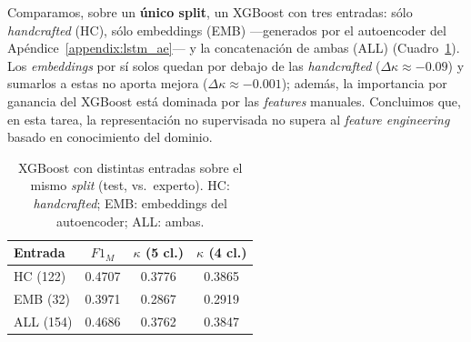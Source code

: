 \documentclass[conference]{IEEEtran}
\begin{document}
Comparamos, sobre un \textbf{único split}, un XGBoost con tres entradas: sólo \emph{handcrafted} (HC), sólo embeddings (EMB) ---generados por el autoencoder del Apéndice~\ref{appendix:lstm_ae}--- y la concatenación de ambas (ALL) (Cuadro~\ref{tab:emb}). Los \emph{embeddings} por sí solos quedan por debajo de las \emph{handcrafted} ($\Delta\kappa \approx -0.09$) y sumarlos a estas no aporta mejora ($\Delta\kappa \approx -0.001$); además, la importancia por ganancia del XGBoost está dominada por las \emph{features} manuales. Concluimos que, en esta tarea, la representación no supervisada no supera al \emph{feature engineering} basado en
conocimiento del dominio.

\begin{table}[h]
\caption{XGBoost con distintas entradas sobre el mismo \emph{split} (test, vs.\ experto). HC: \emph{handcrafted}; EMB: embeddings del autoencoder; ALL: ambas.}
\label{tab:emb}
\centering
\begin{tabular}{lccc}
\hline
\textbf{Entrada} & \textbf{$F1_{M}$} & \textbf{$\kappa$ (5 cl.)} & \textbf{$\kappa$ (4 cl.)} \\
\hline
HC (122) & 0.4707 & 0.3776 & 0.3865 \\
EMB (32) & 0.3971 & 0.2867 & 0.2919 \\
ALL (154) & 0.4686 & 0.3762 & 0.3847 \\
\hline
\end{tabular}
\end{table}


\nocite{*}

\end{document}
